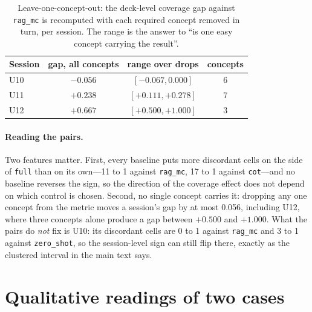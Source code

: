 \documentclass[11pt,a4paper]{article}
\newcommand{\id}[1]{\texttt{#1}}
\begin{document}
\begin{table}[htbp]
\centering
\caption{Concept-level pairs against each baseline, $N=48$ per row. ``both'' =
covered by both conditions, ``\id{full} only'' / ``base only'' = the discordant
cells, RD = paired risk difference. Regenerated by
\id{python paper/concept\_pairs.py}.}
\label{tab:s-pairs}
\small

\end{table}

\begin{table}[htbp]
\centering
\caption{Leave-one-concept-out: the deck-level coverage gap against \id{rag\_mc}
is recomputed with each required concept removed in turn, per session. The range
is the answer to ``is one easy concept carrying the result''.}
\label{tab:s-loo}
\small
\begin{tabular}{@{}l ccc@{}}
\toprule
Session & gap, all concepts & range over drops & concepts \\
\midrule
U10 & $-0.056$ & $[-0.067, 0.000]$ & 6 \\
U11 & $+0.238$ & $[+0.111, +0.278]$ & 7 \\
U12 & $+0.667$ & $[+0.500, +1.000]$ & 3 \\
\bottomrule
\end{tabular}
\end{table}

\paragraph{Reading the pairs.} Two features matter. First, every baseline puts
more discordant cells on the side of \id{full} than on its own---11 to 1 against
\id{rag\_mc}, 17 to 1 against \id{cot}---and no baseline reverses the sign, so
the direction of the coverage effect does not depend on which control is chosen.
Second, no single concept carries it: dropping any one concept from the metric
moves a session's gap by at most 0.056, including U12, where three concepts alone
produce a gap between $+0.500$ and $+1.000$. What the pairs do \emph{not} fix is
U10: its discordant cells are 0 to 1 against \id{rag\_mc} and 3 to 1 against
\id{zero\_shot}, so the session-level sign can still flip there, exactly as the
clustered interval in the main text says.

\section{Qualitative readings of two cases}
\label{sec:s6}
\end{document}
